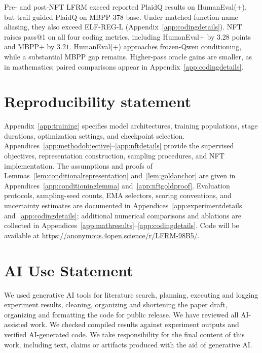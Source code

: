 \documentclass{article}
\newlength{\conferenceparskip}
\begin{document}
Pre- and post-NFT LFRM exceed reported PlaidQ results on HumanEval(+), but trail guided PlaidQ on MBPP-378 base. Under matched function-name aliasing, they also exceed ELF-REG-L (Appendix~\ref{app:codingdetails}). NFT raises pass@1 on all four coding metrics, including HumanEval+ by $3.28$ points and MBPP+ by $3.21$. HumanEval(+) approaches frozen-Qwen conditioning, while a substantial MBPP gap remains. Higher-pass oracle gains are smaller, as in mathematics; paired comparisons appear in Appendix~\ref{app:codingdetails}.


\clearpage
\setlength{\parskip}{\conferenceparskip}
\section*{Reproducibility statement}
Appendix~\ref{app:training} specifies model architectures, training populations, stage durations, optimization settings, and checkpoint selection. Appendices~\ref{app:methodobjective}--\ref{app:nftdetails} provide the supervised objectives, representation construction, sampling procedures, and NFT implementation. The assumptions and proofs of Lemmas~\ref{lem:conditionalrepresentation} and~\ref{lem:goldanchor} are given in Appendices~\ref{app:conditioninglemma} and~\ref{app:nftgoldproof}. Evaluation protocols, sampling-seed counts, EMA selectors, scoring conventions, and uncertainty estimates are documented in Appendices~\ref{app:experimentdetails} and~\ref{app:codingdetails}; additional numerical comparisons and ablations are collected in Appendices~\ref{app:mathresults}--\ref{app:codingdetails}. Code will be available at \url{https://anonymous.4open.science/r/LFRM-98B5/}.

\section*{AI Use Statement}
We used generative AI tools for literature search, planning, executing and logging experiment results, cleaning, organizing and shortening the paper draft, organizing and formatting the code for public release. We have reviewed all AI-assisted work. We checked compiled results against experiment outputs and verified AI-generated code. We take responsibility for the final content of this work, including text, claims or artifacts produced with the aid of generative AI.



\end{document}
